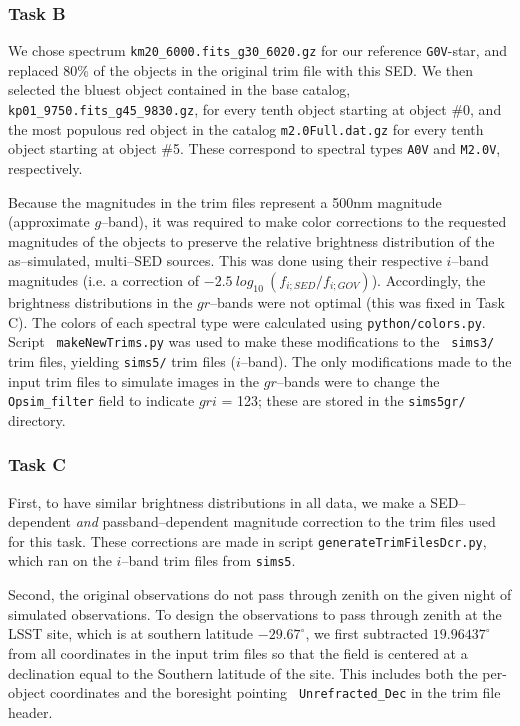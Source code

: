 \documentclass[prd, nofootinbib, floatfix, 11pt, tightenlines, times]{article}
\begin{document}
\begin{appendices}
\subsubsection{Task B}

We chose spectrum {\tt km20\_6000.fits\_g30\_6020.gz} for our
reference {\tt G0V}-star, and replaced 80\% of the objects in the
original trim file with this SED.  We then selected the bluest object
contained in the base catalog, {\tt kp01\_9750.fits\_g45\_9830.gz},
for every tenth object starting at object \#0, and the most populous
red object in the catalog {\tt m2.0Full.dat.gz} for every tenth object
starting at object \#5.  These correspond to spectral types {\tt A0V}
and {\tt M2.0V}, respectively.  

Because the magnitudes in the trim files represent a 500nm magnitude
(approximate $g$--band), it was required to make color corrections to
the requested magnitudes of the objects to preserve the relative
brightness distribution of the as--simulated, multi--SED sources.
This was done using their respective $i$--band magnitudes (i.e. a
correction of $-2.5~log_{10}~( f_{i;SED} / f_{i;GOV} )$).
Accordingly, the brightness distributions in the $gr$--bands were not
optimal (this was fixed in Task C).  The colors of each spectral type
were calculated using {\tt python/colors.py}.  Script {\tt
  makeNewTrims.py} was used to make these modifications to the {\tt
  sims3/} trim files, yielding {\tt sims5/} trim files ($i$--band).
The only modifications made to the input trim files to simulate images
in the $gr$--bands were to change the {\tt Opsim\_filter} field to
indicate $gri$ = 123; these are stored in the {\tt sims5gr/}
directory.

\subsubsection{Task C}

First, to have similar brightness distributions in all data, we make a
SED--dependent {\it and} passband--dependent magnitude correction to
the trim files used for this task.  These corrections are made in
script {\tt generateTrimFilesDcr.py}, which ran on the $i$--band trim
files from {\tt sims5}.

Second, the original observations do not pass through zenith on the
given night of simulated observations.  To design the observations to
pass through zenith at the LSST site, which is at southern latitude
$-29.67^{\circ}$, we first subtracted $19.96437^{\circ}$ from all
coordinates in the input trim files so that the field is centered at a
declination equal to the Southern latitude of the site.  This includes
both the per-object coordinates and the boresight pointing {\tt
  Unrefracted\_Dec} in the trim file header.


\end{appendices}
\end{document}
